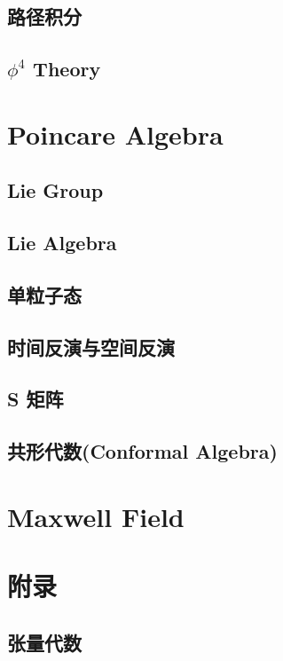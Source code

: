 \documentclass{article}
\begin{document}
\subsection{路径积分}



\subsection{$\phi^4$ Theory}


\section{Poincare Algebra}


\subsection{Lie Group}



\subsection{Lie Algebra}



\subsection{单粒子态}




\subsection{时间反演与空间反演}




\subsection{S 矩阵}

\subsection{共形代数(Conformal Algebra)}




\section{Maxwell Field}































\section{附录}
\subsection{张量代数}
\end{document}
